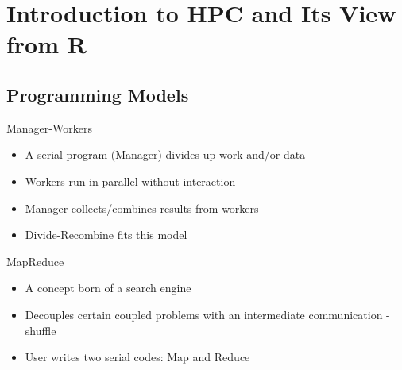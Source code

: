 \section{Introduction to HPC and Its View from R}
\makesubcontentsslides





\subsection{Programming Models}
\makesubcontentsslidessec

\begin{frame}{Manager-Workers}
  \begin{block}{}
    \begin{itemize}
    \item A serial program (Manager) divides up work and/or data
    \item Workers run in parallel without interaction
    \item Manager collects/combines results from workers
    \item Divide-Recombine fits this model
    \end{itemize}
  \end{block}
\end{frame}

\begin{frame}{MapReduce}
  \begin{block}{}
    \begin{itemize}
    \item A concept born of a search engine
    \item Decouples certain coupled problems with an intermediate
      communication - shuffle
    \item User writes two serial codes: Map and Reduce
    \end{itemize}
  \end{block}
\end{frame}

